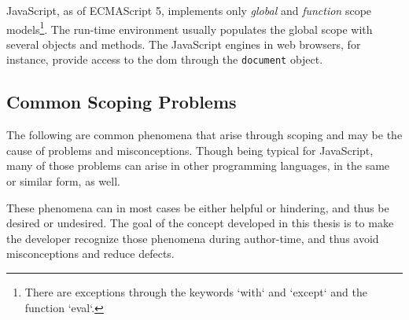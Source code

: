 JavaScript, as of ECMAScript 5, implements only \emph{global} and
\emph{function} scope
models\footnote{There are exceptions through the keywords `with` and `except` and the function `eval`.}.
The run-time environment usually populates the global scope with several
objects and methods. The JavaScript engines in web browsers, for
instance, provide access to the \ac{dom} through the \texttt{document}
object.

\subsection{Common Scoping Problems}\label{common-scoping-problems}

The following are common phenomena that arise through scoping and may be
the cause of problems and misconceptions. Though being typical for
JavaScript, many of those problems can arise in other programming
languages, in the same or similar form, as well.

These phenomena can in most cases be either helpful or hindering, and
thus be desired or undesired. The goal of the concept developed in this
thesis is to make the developer recognize those phenomena during
author-time, and thus avoid misconceptions and reduce defects.

